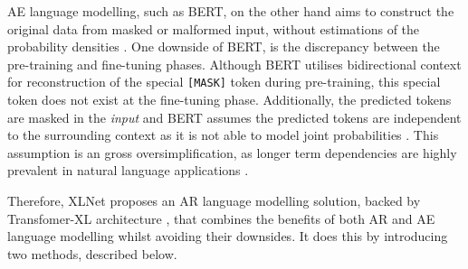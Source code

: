 \documentclass[10pt,oneside]{report}
\begin{document}
AE language modelling, such as BERT, on the other hand aims to construct the original data from masked or malformed input, without estimations of the probability densities \cite{yang2019xlnet}. 
One downside of BERT, is the discrepancy between the pre-training and fine-tuning phases. Although BERT utilises bidirectional context for reconstruction of the special \texttt{[MASK]} token during pre-training, this special token does not exist at the fine-tuning phase. Additionally, the predicted tokens are masked in the \textit{input} and BERT assumes the predicted tokens are independent to the surrounding context as it is not able to model joint probabilities \cite{yang2019xlnet}. This assumption is an gross oversimplification, as longer term dependencies are highly prevalent in natural language applications \cite{schank1972conceptual, dai2019transformer}. 

Therefore, XLNet proposes an AR language modelling solution, backed by Transfomer-XL architecture \cite{dai2019transformer}, that combines the benefits of both AR and AE language modelling whilst avoiding their downsides. It does this by introducing two methods, described below.
\end{document}
